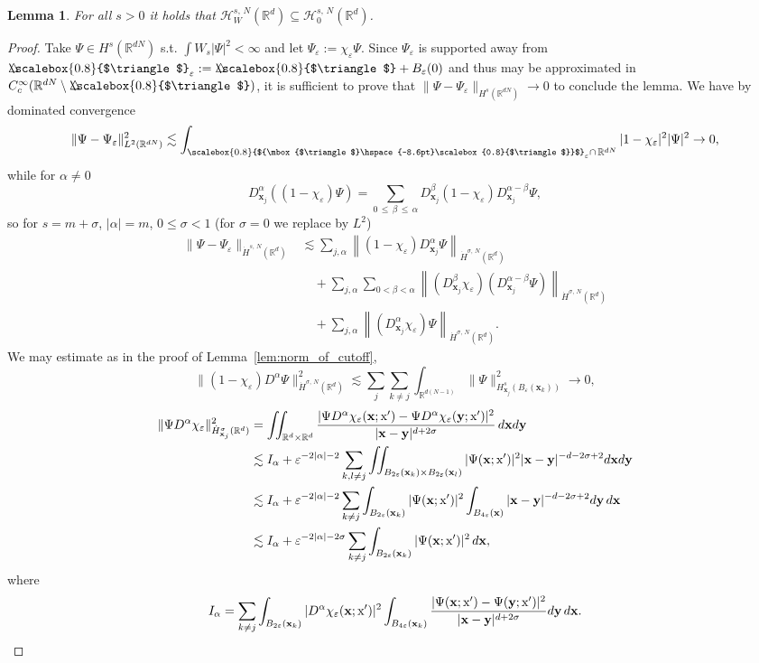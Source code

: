 \documentclass[10pt]{amsart}
\newtheorem{lemm}[theo]{Lemma}\newtheorem{prop}[theo]{Proposition}\newtheorem{coro}[theo]{Corollary}\newtheorem{conj}[theo]{Conjecture}
\theoremstyle{definition}\newtheorem{defi}[theo]{Definition}\newtheorem{rema}[theo]{Remark}\newtheorem{exam}[theo]{Example}\newtheorem{exem}[theo]{Example}\newtheorem{nota}[theo]{Notation}
\newcommand*\eps{\varepsilon}
\newcommand*\R {\mathbb{R}}
\newcommand\1{{\ensuremath {\mathds 1} }}
\newcommand{\bx}{\mathbf{x}}
\newcommand{\by}{\mathbf{y}}
\newcommand{\cH}{\mathcal{H}}
\newcommand{\sx}{\textup{x}}
\newcommand{\bDelta}{{\mbox{$\triangle$}\hspace{-8.6pt}\scalebox{0.8}{$\triangle$}}}
\newcommand{\scriptbDelta}{\scalebox{0.8}{$\bDelta$}}
\begin{document}
\begin{lemm}\label{lem:inclusion_of_spaces_W}
For all $s > 0$ it holds that $\cH^{s,\,N}_W(\R^d) \subseteq \cH^{s,\,N}_0(\R^d)$.
\end{lemm}
\begin{proof}
Take $\Psi \in H^s(\R^{dN})$ s.t. $\int W_s|\Psi|^2 < \infty$ and let $\Psi_\eps := \chi_\eps\Psi$. Since $\Psi_\eps$ is supported away from $\bDelta_\eps := \bDelta + B_\eps(0)$ and thus may be approximated in $C_c^\infty(\R^{dN}\linebreak\setminus \bDelta)$, it is sufficient to prove that $\|\Psi-\Psi_\eps\|_{H^{s}(\R^{dN})} \to 0$ to conclude the lemma. We have by dominated convergence
\[
\|\Psi-\Psi_\eps\|_{L^2\left(\R^{dN}\right)}^2 \lesssim \int_{\scriptbDelta_\eps \cap \,\R^{dN}} |1-\chi_\eps|^2 |\Psi|^2 \to 0,
\]
while for $\alpha \neq 0$
\[
D^\alpha_{\bx_j}((1-\chi_\eps)\Psi) = \sum_{0\,\le\,\beta\,\le\,\alpha} D^\beta_{\bx_j}(1-\chi_\eps) D^{\alpha-\beta}_{\bx_j}\Psi,
\]
so for $s=m+\sigma$, $|\alpha| = m$, $0 \le \sigma < 1$ (for $\sigma=0$ we replace by $L^2$)
\begin{align*}
\|\Psi-\Psi_\eps\|_{\dot{H}^{s,\,N}(\R^d)} &\lesssim \sum_{j,\alpha} \left\|(1-\chi_\eps)D^\alpha_{\bx_j}\Psi\right\|_{\dot{H}^{\sigma,\,N}(\R^d)}\\
&\quad+ \sum_{j,\alpha} \sum_{0<\beta<\alpha} \left\|(D^\beta_{\bx_j} \chi_\eps) (D^{\alpha-\beta}_{\bx_j}\Psi)\right\|_{\dot{H}^{\sigma,\,N}(\R^d)} \\
&\quad+ \sum_{j,\alpha} \left\|(D^\alpha_{\bx_j} \chi_\eps) \Psi\right\|_{\dot{H}^{\sigma,\,N}(\R^d)}.
\end{align*}
We may estimate as in the proof of Lemma~\ref{lem:norm_of_cutoff},
\[
\|(1-\chi_\eps)D^\alpha\Psi\|_{\dot{H}^{\sigma,\,N}(\R^d)}^2
\lesssim \sum_j\sum_{k\neq j} \int_{\R^{d(N-1)}} \|\Psi\|_{H^{s}_{\bx_j}(B_\eps(\bx_k))}^2
\to 0,
\]
\begin{align*}
\|\Psi D^\alpha \chi_\eps\|_{\dot{H}^\sigma_{\bx_j}(\R^d)}^2 &= \iint_{\R^d \times \R^d} \dfrac{|\Psi D^\alpha\chi_\eps(\bx;\sx') - \Psi D^\alpha\chi_\eps(\by;\sx')|^2}{|\bx-\by|^{d+2\sigma}} \,d\bx d\by \\
&\lesssim I_\alpha + \eps^{-2|\alpha|-2} \sum_{k,l \neq j} \iint_{B_{2\eps}(\bx_k) \times B_{2\eps}(\bx_l)} |\Psi(\bx;\sx')|^2|\bx - \by|^{-d-2\sigma+2} d\bx d\by \\
&\lesssim I_\alpha + \eps^{-2|\alpha|-2} \sum_{k \neq j} \int_{B_{2\eps}(\bx_k)} |\Psi(\bx;\sx')|^2 \int_{B_{4\eps}(\bx)} |\bx - \by|^{-d-2\sigma+2} d\by \,d\bx \\
&\lesssim I_\alpha + \eps^{-2|\alpha| - 2\sigma} \sum_{k \neq j}
\int_{B_{2\eps}(\bx_k)} |\Psi(\bx;\sx')|^2 \,d\bx,
\end{align*}
where
\begin{equation*}
I_\alpha = \sum_{k \neq j} \int_{B_{2\eps}(\bx_k)} |D^\alpha\chi_\eps(\bx;\sx')|^2 \int_{B_{4\eps}(\bx_k)} \dfrac{|\Psi(\bx;\sx') - \Psi(\by;\sx')|^2}{|\bx-\by|^{d+2\sigma}} d\by \,d\bx.
\end{equation*}


\end{proof}
\end{document}
